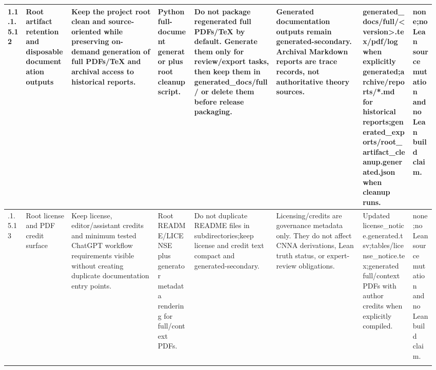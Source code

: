 \begin{longtable}{L{0.042\linewidth} L{0.105\linewidth} L{0.195\linewidth} L{0.08\linewidth} L{0.185\linewidth} L{0.19\linewidth} L{0.118\linewidth} L{0.055\linewidth}}
1.1.1.5.12 & Root artifact retention and disposable documentation outputs & Keep the project root clean and source-oriented while preserving on-demand generation of full PDFs/\allowbreak{}TeX and archival access to historical reports. & Python full-document generator plus root cleanup script. & Do not package regenerated full PDFs/\allowbreak{}TeX by default. Generate them only for review/\allowbreak{}export tasks, then keep them in generated\_docs/\allowbreak{}full/\allowbreak{} or delete them before release packaging. & Generated documentation outputs remain generated-secondary. Archival Markdown reports are trace records, not authoritative theory sources. & generated\_docs/\allowbreak{}full/\allowbreak{}<version>.tex/\allowbreak{}pdf/\allowbreak{}log when explicitly generated;\newline archive/\allowbreak{}reports/\allowbreak{}*.md for historical reports;\newline generated\_exports/\allowbreak{}root\_artifact\_cleanup.generated.json when cleanup runs. & none;\newline no Lean source mutation and no Lean build claim.\\
\hline
{}.1.5.13 & Root license and PDF credit surface & Keep license, editor/\allowbreak{}assistant credits and minimum tested ChatGPT workflow requirements visible without creating duplicate documentation entry points. & Root README/\allowbreak{}LICENSE plus generator metadata rendering for full/\allowbreak{}context PDFs. & Do not duplicate README files in subdirectories;\newline keep license and credit text compact and generated-secondary. & Licensing/\allowbreak{}credits are governance metadata only. They do not affect CNNA derivations, Lean truth status, or expert-review obligations. & Updated license\_notice.generated.tsv;\newline tables/\allowbreak{}license\_notice.tex;\newline generated full/\allowbreak{}context PDFs with author credits when explicitly compiled. & none;\newline no Lean source mutation and no Lean build claim.\\
\hline
\addlinespace[0.24em]

\end{longtable}
